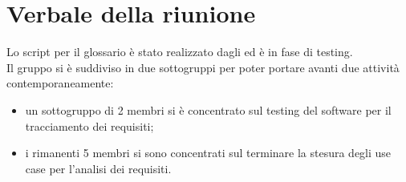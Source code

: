 \documentclass[../Riunione16-01-13.tex]{subfiles}
\begin{document}
\section{Verbale della riunione}
Lo script per il glossario è stato realizzato dagli \amministratori ed è in fase di testing. \\
Il gruppo si è suddiviso in due sottogruppi per poter portare avanti due attività contemporaneamente:
\begin{itemize}
	\item un sottogruppo di 2 membri si è concentrato sul testing del software per il tracciamento dei requisiti;
	\item i rimanenti 5 membri si sono concentrati sul terminare la stesura degli use case per l'analisi dei requisiti.
\end{itemize}
\end{document}
